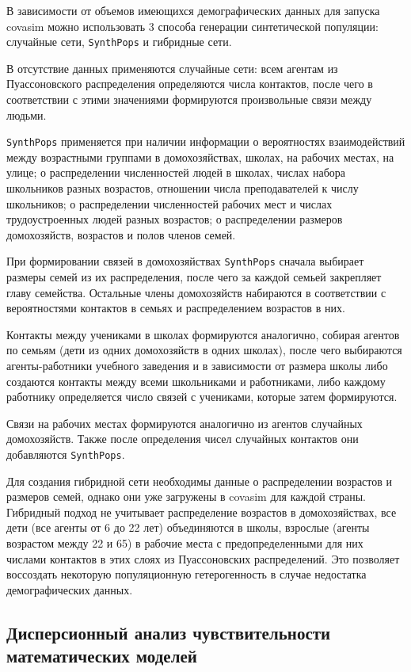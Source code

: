 \documentclass[a4paper,12pt]{article} %
\begin{document}
В зависимости от объемов имеющихся демографических данных для запуска \gls{covasim} можно использовать 3 способа генерации синтетической популяции: случайные сети, \texttt{SynthPops} и гибридные сети.

В отсутствие данных применяются случайные сети: всем агентам из Пуассоновского распределения определяются числа контактов, после чего в соответствии с этими значениями формируются произвольные связи между людьми.

\texttt{SynthPops} применяется при наличии информации о вероятностях взаимодействий между возрастными группами в домохозяйствах, школах, на рабочих местах, на улице; о распределении численностей людей в школах, числах набора школьников разных возрастов, отношении числа преподавателей к числу школьников; о распределении численностей рабочих мест и числах трудоустроенных людей разных возрастов; о распределении размеров домохозяйств, возрастов и полов членов семей. 

При формировании связей в домохозяйствах \texttt{SynthPops} сначала выбирает размеры семей из их распределения, после чего за каждой семьей закрепляет главу семейства. Остальные члены домохозяйств набираются в соответствии с вероятностями контактов в семьях и распределением возрастов в них.

Контакты между учениками в школах формируются аналогично, собирая агентов по семьям (дети из одних домохозяйств в одних школах), после чего выбираются агенты-работники учебного заведения и в зависимости от размера школы либо создаются контакты между всеми школьниками и работниками, либо каждому работнику определяется число связей с учениками, которые затем формируются.

Связи на рабочих местах формируются аналогично из агентов случайных домохозяйств. Также после определения чисел случайных контактов они добавляются \texttt{SynthPops}.

Для создания гибридной сети необходимы данные о распределении возрастов и размеров семей, однако они уже загружены в \gls{covasim} для каждой страны. Гибридный подход не учитывает распределение возрастов в домохозяйствах, все дети (все агенты от 6 до 22 лет) объединяются в школы, взрослые (агенты возрастом между 22 и 65) в рабочие места с предопределенными для них числами контактов в этих слоях из Пуассоновских распределений. Это позволяет воссоздать некоторую популяционную гетерогенность в случае недостатка демографических данных.



\subsection{Дисперсионный анализ чувствительности математических моделей}
\end{document}
